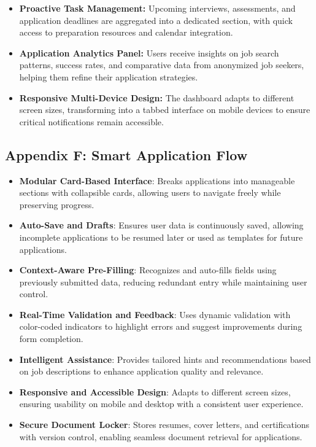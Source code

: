 \documentclass[
	letterpaper, %
]{jdf}
\begin{document}
\begin{sloppypar}
\begin{itemize}
    \item \textbf{Proactive Task Management:} Upcoming interviews, assessments, and application deadlines are aggregated into a dedicated section, with quick access to preparation resources and calendar integration.
    
    \item \textbf{Application Analytics Panel:} Users receive insights on job search patterns, success rates, and comparative data from anonymized job seekers, helping them refine their application strategies.
    
    \item \textbf{Responsive Multi-Device Design:} The dashboard adapts to different screen sizes, transforming into a tabbed interface on mobile devices to ensure critical notifications remain accessible.
\end{itemize}

\hfill \break
\subsection{Appendix F: Smart Application Flow}
\begin{itemize}
    \item \textbf{Modular Card-Based Interface}: Breaks applications into manageable sections with collapsible cards, allowing users to navigate freely while preserving progress.
    \item \textbf{Auto-Save and Drafts}: Ensures user data is continuously saved, allowing incomplete applications to be resumed later or used as templates for future applications.
    \item \textbf{Context-Aware Pre-Filling}: Recognizes and auto-fills fields using previously submitted data, reducing redundant entry while maintaining user control.
    \item \textbf{Real-Time Validation and Feedback}: Uses dynamic validation with color-coded indicators to highlight errors and suggest improvements during form completion.
    \item \textbf{Intelligent Assistance}: Provides tailored hints and recommendations based on job descriptions to enhance application quality and relevance.
    \item \textbf{Responsive and Accessible Design}: Adapts to different screen sizes, ensuring usability on mobile and desktop with a consistent user experience.
    \item \textbf{Secure Document Locker}: Stores resumes, cover letters, and certifications with version control, enabling seamless document retrieval for applications.
\end{itemize}


\end{sloppypar}
\end{document}

